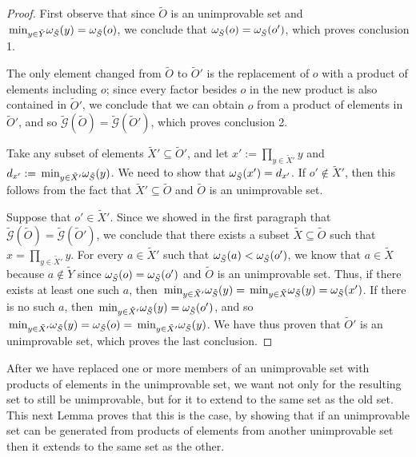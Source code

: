 \documentclass[twocolumn,showpacs,preprintnumbers,amsmath,amssymb,nofootinbib,pra,floatfix]{revtex4-1}
\newenvironment{remark}[1][Remark]{\begin{trivlist}
\item[\hskip \labelsep {\bfseries #1}]}{\end{trivlist}}
\newcommand{\set}{\tilde}
\newcommand{\genfun}{\tilde{\mathcal{G}}}
\begin{document}
\begin{proof}
First observe that since $\set O$ is an unimprovable set and $\min_{y\in\set Y}\om_{\set S}(y)=\om_{\set S}(o)$, we conclude that $\om_{\set S}(o)=\om_{\set S}(o')$, which proves conclusion 1.

The only element changed from $\set O$ to $\set O'$ is the replacement of $o$ with a product of elements including $o$;  since every factor besides $o$ in the new product is also contained in $\set O'$, we conclude that we can obtain $o$ from a product of elements in $\set O'$, and so $\genfun(\set O)=\genfun(\set O')$, which proves conclusion 2.

Take any subset of elements $\set X'\subseteq\set O'$, and let $x' := \prod_{y\in \set X'} y$ and $d_{x'}:=\min_{y\in\set X'}\om_{\set S}(y)$.  We need to show that $\om_{\set S}(x') = d_{x'}$.  If $o'\notin\set X'$, then this follows from the fact that $\set X'\subseteq\set O$ and $\set O$ is an unimprovable set.

Suppose that $o'\in\set X'$. Since we showed in the first paragraph that $\genfun(\set O)=\genfun(\set O')$, we conclude that there exists a subset $\set X\subseteq\set O$ such that $x=\prod_{y\in \set X'}y$.  For every $a\in\set X'$ such that $\om_{\set S}(a)<\om_{\set S}(o')$, we know that $a\in\set X$ because $a\notin\set Y$ since $\om_{\set S}(o)=\om_{\set S}(o')$ and $\set O$ is an unimprovable set.  Thus, if there exists at least one such $a$, then $\min_{y\in\set X'}\om_{\set S}(y)=\min_{y\in\set X}\om_{\set S}(y)=\om_{\set S}(x')$.  If there is no such $a$, then $\min_{y\in\set X'}\om_{\set S}(y)=\om_{\set S}(o')$, and so $\min_{y\in\set X'}\om_{\set S}(y)=\om_{\set S}(o)=\min_{y\in\set X'}\om_{\set S}(y)$.  We have thus proven that $\set O'$ is an unimprovable set, which proves the last conclusion.

\end{proof}
\begin{remark}
After we have replaced one or more members of an unimprovable set with products of elements in the unimprovable set, we want not only for the resulting set to still be unimprovable, but for it to extend to the same set as the old set.  This next Lemma proves that this is the case, by showing that if an unimprovable set can be generated from products of elements from another unimprovable set then it extends to the same set as the other.
\end{remark}
\end{document}
